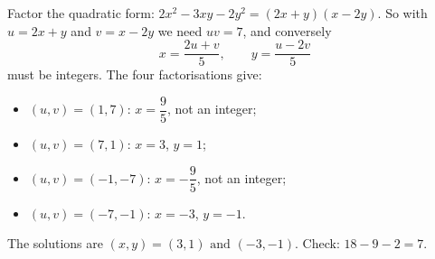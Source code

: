 Factor the quadratic form: $2x^2-3xy-2y^2=(2x+y)(x-2y)$. So with $u=2x+y$ and $v=x-2y$ we need $uv=7$, and conversely
\[
x=\dfrac{2u+v}{5},\qquad y=\dfrac{u-2v}{5}
\]
must be integers. The four factorisations give:
\begin{itemize}
\item $(u,v)=(1,7)$: $x=\dfrac{9}{5}$, not an integer;
\item $(u,v)=(7,1)$: $x=3$, $y=1$;
\item $(u,v)=(-1,-7)$: $x=-\dfrac{9}{5}$, not an integer;
\item $(u,v)=(-7,-1)$: $x=-3$, $y=-1$.
\end{itemize}
The solutions are $\boxed{(x,y)=(3,1)\text{ and }(-3,-1)}$. Check: $18-9-2=7$.
